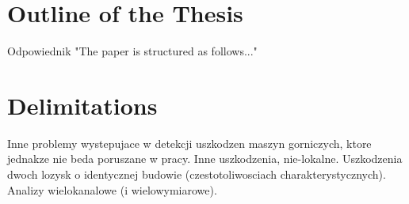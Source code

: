 \section{Outline of the Thesis}

Odpowiednik "The paper is structured as follows..."


\section{Delimitations}

Inne problemy wystepujace w detekcji uszkodzen maszyn gorniczych, ktore jednakze nie beda poruszane w pracy. Inne uszkodzenia, nie-lokalne. Uszkodzenia dwoch lozysk o identycznej budowie (czestotoliwosciach charakterystycznych). Analizy wielokanalowe (i wielowymiarowe).